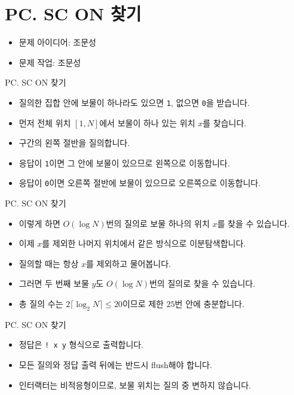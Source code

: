 \def\probno{PC}
\def\probtitle{SC ON 찾기}

\section{\probno{}. \probtitle{}}

\begin{frame}
    \sectiontitle{\probno{}}{\probtitle{}}
    \begin{itemize}
        \item 문제 아이디어: 조문성
        \item 문제 작업: 조문성
    \end{itemize}
\end{frame}

\begin{frame}{\probno{}. \probtitle{}}
    \begin{itemize}
        \item 질의한 집합 안에 보물이 하나라도 있으면 \texttt{1}, 없으면 \texttt{0}을 받습니다.
        \item 먼저 전체 위치 $[1,N]$에서 보물이 하나 있는 위치 $x$를 찾습니다.
        \item 구간의 왼쪽 절반을 질의합니다.
        \item 응답이 \texttt{1}이면 그 안에 보물이 있으므로 왼쪽으로 이동합니다.
        \item 응답이 \texttt{0}이면 오른쪽 절반에 보물이 있으므로 오른쪽으로 이동합니다.
    \end{itemize}
\end{frame}

\begin{frame}{\probno{}. \probtitle{}}
    \begin{itemize}
        \item 이렇게 하면 $O(\log N)$번의 질의로 보물 하나의 위치 $x$를 찾을 수 있습니다.
        \item 이제 $x$를 제외한 나머지 위치에서 같은 방식으로 이분탐색합니다.
        \item 질의할 때는 항상 $x$를 제외하고 물어봅니다.
        \item 그러면 두 번째 보물 $y$도 $O(\log N)$번의 질의로 찾을 수 있습니다.
        \item 총 질의 수는 $2\lceil \log_2 N\rceil \le 20$이므로 제한 $25$번 안에 충분합니다.
    \end{itemize}
\end{frame}

\begin{frame}{\probno{}. \probtitle{}}
    \begin{itemize}
        \item 정답은 \texttt{! x y} 형식으로 출력합니다.
        \item 모든 질의와 정답 출력 뒤에는 반드시 flush해야 합니다.
        \item 인터랙터는 비적응형이므로, 보물 위치는 질의 중 변하지 않습니다.
    \end{itemize}
\end{frame}
